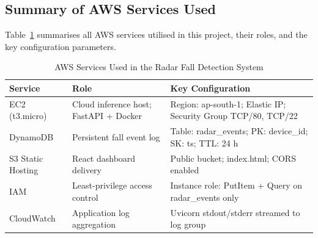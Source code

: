 \subsection{Summary of AWS Services Used}

Table~\ref{tab:aws_summary} summarises all AWS services utilised in this project, their roles, and the key configuration parameters.

\begin{table}[H]
\caption{AWS Services Used in the Radar Fall Detection System}
\label{tab:aws_summary}
\centering
\begin{tabularx}{\textwidth}{@{} l X X @{}}
\toprule
\textbf{Service} & \textbf{Role} & \textbf{Key Configuration} \\ \midrule
EC2 (t3.micro) & Cloud inference host; FastAPI + Docker & Region: ap-south-1; Elastic IP; Security Group TCP/80, TCP/22 \\
DynamoDB & Persistent fall event log & Table: radar\_events; PK: device\_id; SK: ts; TTL: 24 h \\
S3 Static Hosting & React dashboard delivery & Public bucket; index.html; CORS enabled \\
IAM & Least-privilege access control & Instance role: PutItem + Query on radar\_events only \\
CloudWatch & Application log aggregation & Uvicorn stdout/stderr streamed to log group \\ \bottomrule
\end{tabularx}
\end{table}